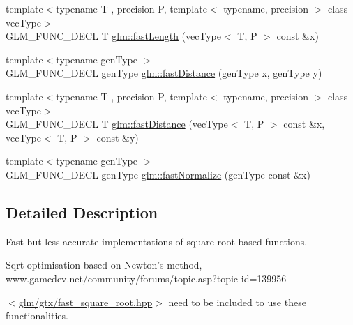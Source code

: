 \begin{DoxyCompactItemize}
\item 
{\footnotesize template$<$typename T , precision P, template$<$ typename, precision $>$ class vec\-Type$>$ }\\G\-L\-M\-\_\-\-F\-U\-N\-C\-\_\-\-D\-E\-C\-L T \hyperlink{group__gtx__fast__square__root_gae28a3099cbd6404a4ea8ef22147ed7b0}{glm\-::fast\-Length} (vec\-Type$<$ T, P $>$ const \&x)
\item 
{\footnotesize template$<$typename gen\-Type $>$ }\\G\-L\-M\-\_\-\-F\-U\-N\-C\-\_\-\-D\-E\-C\-L gen\-Type \hyperlink{group__gtx__fast__square__root_gaac333418d0c4e0cc6d3d219ed606c238}{glm\-::fast\-Distance} (gen\-Type x, gen\-Type y)
\item 
{\footnotesize template$<$typename T , precision P, template$<$ typename, precision $>$ class vec\-Type$>$ }\\G\-L\-M\-\_\-\-F\-U\-N\-C\-\_\-\-D\-E\-C\-L T \hyperlink{group__gtx__fast__square__root_ga6d1ac559cd77d69119e30c3aca0e14b5}{glm\-::fast\-Distance} (vec\-Type$<$ T, P $>$ const \&x, vec\-Type$<$ T, P $>$ const \&y)
\item 
{\footnotesize template$<$typename gen\-Type $>$ }\\G\-L\-M\-\_\-\-F\-U\-N\-C\-\_\-\-D\-E\-C\-L gen\-Type \hyperlink{group__gtx__fast__square__root_ga3b02c1d6e0c754144e2f1e110bf9f16c}{glm\-::fast\-Normalize} (gen\-Type const \&x)
\end{DoxyCompactItemize}


\subsection{Detailed Description}
Fast but less accurate implementations of square root based functions. 
\begin{DoxyItemize}
\item Sqrt optimisation based on Newton's method, www.\-gamedev.\-net/community/forums/topic.asp?topic id=139956
\end{DoxyItemize}

$<$\hyperlink{fast__square__root_8hpp}{glm/gtx/fast\-\_\-square\-\_\-root.\-hpp}$>$ need to be included to use these functionalities. 

